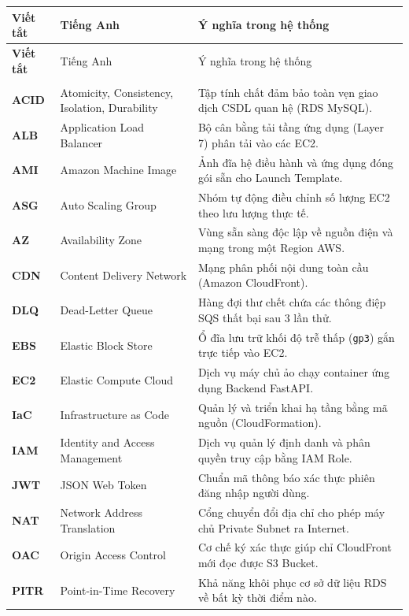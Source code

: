 {\small
\renewcommand{\arraystretch}{1.20}
\begin{longtable}{>{\bfseries}p{1.8cm} >{\raggedright\arraybackslash}p{5.2cm} >{\raggedright\arraybackslash}p{7.6cm}}
  \toprule
  Viết tắt & Tiếng Anh & Ý nghĩa trong hệ thống \\
  \midrule
  \endfirsthead
  \toprule
  Viết tắt & Tiếng Anh & Ý nghĩa trong hệ thống \\
  \midrule
  \endhead
  \midrule
  \multicolumn{3}{r}{\textit{(Xem tiếp trang sau)}} \\
  \endfoot
  \bottomrule
  \endlastfoot
  ACID & Atomicity, Consistency, Isolation, Durability & Tập tính chất đảm bảo toàn vẹn giao dịch CSDL quan hệ (RDS MySQL). \\
  ALB & Application Load Balancer & Bộ cân bằng tải tầng ứng dụng (Layer 7) phân tải vào các EC2. \\
  AMI & Amazon Machine Image & Ảnh đĩa hệ điều hành và ứng dụng đóng gói sẵn cho Launch Template. \\
  ASG & Auto Scaling Group & Nhóm tự động điều chỉnh số lượng EC2 theo lưu lượng thực tế. \\
  AZ & Availability Zone & Vùng sẵn sàng độc lập về nguồn điện và mạng trong một Region AWS. \\
  CDN & Content Delivery Network & Mạng phân phối nội dung toàn cầu (Amazon CloudFront). \\
  DLQ & Dead-Letter Queue & Hàng đợi thư chết chứa các thông điệp SQS thất bại sau 3 lần thử. \\
  EBS & Elastic Block Store & Ổ đĩa lưu trữ khối độ trễ thấp (\texttt{gp3}) gắn trực tiếp vào EC2. \\
  EC2 & Elastic Compute Cloud & Dịch vụ máy chủ ảo chạy container ứng dụng Backend FastAPI. \\
  IaC & Infrastructure as Code & Quản lý và triển khai hạ tầng bằng mã nguồn (CloudFormation). \\
  IAM & Identity and Access Management & Dịch vụ quản lý định danh và phân quyền truy cập bằng IAM Role. \\
  JWT & JSON Web Token & Chuẩn mã thông báo xác thực phiên đăng nhập người dùng. \\
  NAT & Network Address Translation & Cổng chuyển đổi địa chỉ cho phép máy chủ Private Subnet ra Internet. \\
  OAC & Origin Access Control & Cơ chế ký xác thực giúp chỉ CloudFront mới đọc được S3 Bucket. \\
  PITR & Point-in-Time Recovery & Khả năng khôi phục cơ sở dữ liệu RDS về bất kỳ thời điểm nào. \\

\end{longtable}}
